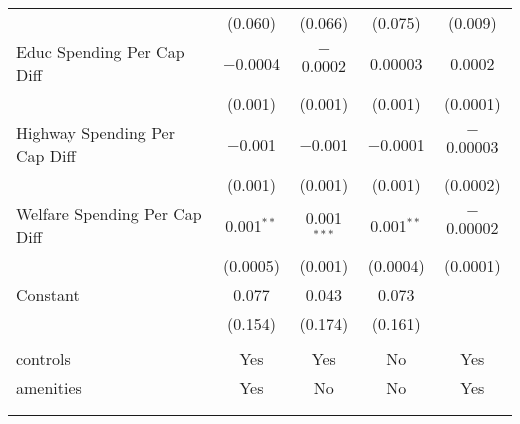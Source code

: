\begin{table}[!htbp]
\begin{tabular}{@{\extracolsep{5pt}}lcccc}
  & (0.060) & (0.066) & (0.075) & (0.009) \\ 
  Educ Spending Per Cap Diff & $-$0.0004 & $-$0.0002 & 0.00003 & 0.0002 \\ 
  & (0.001) & (0.001) & (0.001) & (0.0001) \\ 
  Highway Spending Per Cap Diff & $-$0.001 & $-$0.001 & $-$0.0001 & $-$0.00003 \\ 
  & (0.001) & (0.001) & (0.001) & (0.0002) \\ 
  Welfare Spending Per Cap Diff & 0.001$^{**}$ & 0.001$^{***}$ & 0.001$^{**}$ & $-$0.00002 \\ 
  & (0.0005) & (0.001) & (0.0004) & (0.0001) \\ 
  Constant & 0.077 & 0.043 & 0.073 &  \\ 
  & (0.154) & (0.174) & (0.161) &  \\ 
 \hline \\[-1.8ex] 
controls & Yes & Yes & No & Yes \\ 
amenities & Yes & No & No & Yes \\ 
\hline \\[-1.8ex] 
\hline 
\hline \\[-1.8ex] 
\end{tabular} 
\end{table} 
